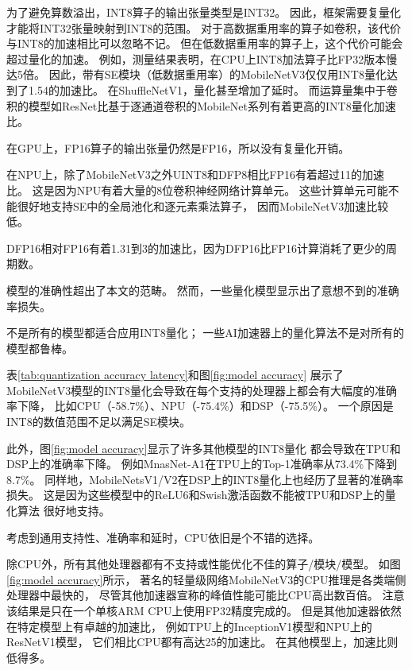 为了避免算数溢出，INT8算子的输出张量类型是INT32。
因此，框架需要复量化才能将INT32张量映射到INT8\cite{krishnamoorthi2018quantizing}的范围。
对于高数据重用率的算子如卷积，该代价与INT8的加速相比可以忽略不记。
但在低数据重用率的算子上，这个代价可能会超过量化的加速。
例如，测量结果表明，在CPU上INT8加法算子比FP32版本慢达5倍。
因此，带有SE模块（低数据重用率）的MobileNetV3仅仅用INT8量化达到了1.54的加速比。
在ShuffleNetV1，量化甚至增加了延时。
而运算量集中于卷积的模型如ResNet比基于逐通道卷积的MobileNet系列有着更高的INT8量化加速比。

在GPU上，FP16算子的输出张量仍然是FP16，所以没有复量化开销。

在NPU上，除了MobileNetV3之外UINT8和DFP8相比FP16有着超过11的加速比。
这是因为NPU有着大量的8位卷积神经网络计算单元。
这些计算单元可能不能很好地支持SE中的全局池化和逐元素乘法算子，
因而MobileNetV3加速比较低。

DFP16相对FP16有着1.31到3的加速比，因为DFP16比FP16计算消耗了更少的周期数。

模型的准确性超出了本文的范畴。
然而，一些量化模型显示出了意想不到的准确率损失。

\begin{finding}
    不是所有的模型都适合应用INT8量化；
    一些AI加速器上的量化算法不是对所有的模型都鲁棒。
\end{finding}

表\ref{tab:quantization accuracy latency}和图\ref{fig:model accuracy}
展示了MobileNetV3模型的INT8量化会导致在每个支持的处理器上都会有大幅度的准确率下降，
比如CPU（-58.7\%）、NPU（-75.4\%）和DSP（-75.5\%）。
一个原因是INT8的数值范围不足以满足SE模块\cite{google_quantization}。

此外，图\ref{fig:model accuracy}显示了许多其他模型的INT8量化
都会导致在TPU和DSP上的准确率下降。
例如MnasNet-A1在TPU上的Top-1准确率从73.4\%下降到8.7\%。
同样地，MobileNetsV1/V2在DSP上的INT8量化上也经历了显著的准确率损失。
这是因为这些模型中的ReLU6和Swish激活函数不能被TPU和DSP上的量化算法
很好地支持\cite{google_quantization, sheng2018quantization}。

\begin{finding}
    考虑到通用支持性、准确率和延时，CPU依旧是个不错的选择。
\end{finding}

除CPU外，所有其他处理器都有不支持或性能优化不佳的算子/模块/模型。
如图\ref{fig:model accuracy}所示，
著名的轻量级网络MobileNetV3的CPU推理是各类端侧处理器中最快的，
尽管其他加速器宣称的峰值性能可能比CPU高出数百倍。
注意该结果是只在一个单核ARM CPU上使用FP32精度完成的。
但是其他加速器依然在特定模型上有卓越的加速比，
例如TPU上的InceptionV1模型和NPU上的ResNetV1模型，
它们相比CPU都有高达25的加速比。
在其他模型上，加速比则低得多。